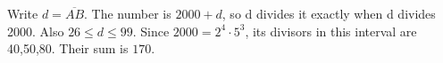Write $d=\overline{AB}$. The number is $2000+d$, so d divides it exactly when d divides 2000. Also $26\le d\le 99$. Since $2000=2^4\cdot 5^3$, its divisors in this interval are 40,50,80. Their sum is $\boxed{170}$.
